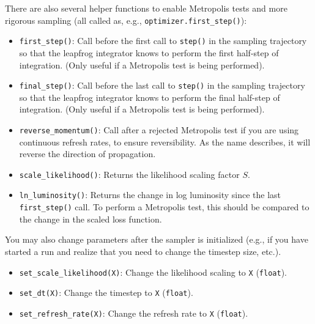 \documentclass[12pt]{article}
\begin{document}
There are also several helper functions to enable Metropolis tests and more rigorous sampling (all called as, e.g., \lstinline{optimizer.first_step()}):
\begin{itemize}
\item \lstinline{first_step()}: Call before the first call to \lstinline{step()} in the sampling trajectory so that the leapfrog integrator knows to perform the first half-step of integration.  (Only useful if a Metropolis test is being performed).
\item \lstinline{final_step()}: Call before the last call to \lstinline{step()} in the sampling trajectory so that the leapfrog integrator knows to perform the final half-step of integration.  (Only useful if a Metropolis test is being performed).
\item \lstinline{reverse_momentum()}: Call after a rejected Metropolis test if you are using continuous refresh rates, to ensure reversibility.  As the name describes, it will reverse the direction of propagation.
\item \lstinline{scale_likelihood()}: Returns the likelihood scaling factor $S$.
\item \lstinline{ln_luminosity()}: Returns the change in log luminosity since the last \lstinline{first_step()} call.  To perform a Metropolis test, this should be compared to the change in the scaled loss function.
\end{itemize}

You may also change parameters after the sampler is initialized (e.g., if you have started a run and realize that you need to change the timestep size, etc.).
\begin{itemize}
\item \lstinline{set_scale_likelihood(X)}: Change the likelihood scaling to \lstinline{X} (\lstinline{float}).
\item \lstinline{set_dt(X)}: Change the timestep to \lstinline{X} (\lstinline{float}).
\item \lstinline{set_refresh_rate(X)}: Change the refresh rate to \lstinline{X} (\lstinline{float}).
\end{itemize}
\end{document}
